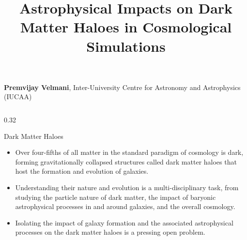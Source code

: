 \documentclass[final]{beamer}
\title{{Astrophysical Impacts on Dark Matter Haloes in Cosmological Simulations}}
\date{}
\begin{document}
\begin{frame}[t]{}%
    \maketitle

\begin{center}
    \vspace{-6.5cm} %
    \vspace{0.5cm}
     \textcolor{darktanbrown}{\LARGE{\textbf{Premvijay Velmani}}, 
     \Large{Inter-University Centre for Astronomy and Astrophysics (IUCAA)}} \\
\end{center}

\vspace{.8cm} %

\begin{columns}[t]
\begin{column}{0.32\textwidth}
    \begin{block}{Dark Matter Haloes}
    \begin{itemize}
        \item Over four-fifths of all matter in the standard paradigm of cosmology is dark, forming gravitationally collapsed structures called dark matter haloes that host the formation and evolution of galaxies.
        \item Understanding their nature and evolution is a multi-disciplinary task, from studying the particle nature of dark matter, the impact of baryonic astrophysical processes in and around galaxies, and the overall cosmology.
        \item Isolating the impact of galaxy formation and the associated astrophysical processes on the dark matter haloes is a pressing open problem.
    \end{itemize}
    \end{block}


\end{column}
\end{columns}
\end{frame}
\end{document}
